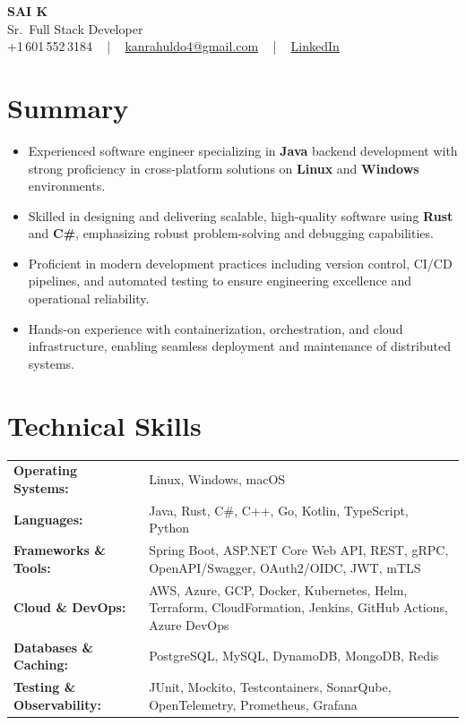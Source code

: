 \documentclass[letterpaper,11pt]{article}
\newcommand{\resumeItem}[1]{
  \item\footnotesize{
    {#1 \vspace{-2pt}}
  }
}
\newcommand{\resumeItemListStart}{\begin{itemize}[leftmargin=*]}
\newcommand{\resumeItemListEnd}{\end{itemize}\vspace{-5pt}}
\begin{document}
\begin{center}
    {\fontsize{14pt}{12pt}\selectfont \textbf{\MakeUppercase{Sai K}}}\\ \vspace{2pt}
    \fontsize{10pt}{12pt}\selectfont Sr.\ Full Stack Developer\\ \vspace{2pt}
    \fontsize{10pt}{12pt}\selectfont +1\,601\,552\,3184 ~ | ~
    \href{mailto:kanrahuldo4@gmail.com}{kanrahuldo4@gmail.com} ~ | ~
    \href{https://www.linkedin.com/in/srrrk/}{\color{blue}\underline{LinkedIn}}
    \vspace{-10pt}
\end{center}

\section{Summary}
\fontsize{9pt}{10pt}\selectfont
\resumeItemListStart
  \resumeItem{Experienced software engineer specializing in \textbf{Java} backend development with strong proficiency in cross-platform solutions on \textbf{Linux} and \textbf{Windows} environments.}
  \resumeItem{Skilled in designing and delivering scalable, high-quality software using \textbf{Rust} and \textbf{C\#}, emphasizing robust problem-solving and debugging capabilities.}
  \resumeItem{Proficient in modern development practices including version control, CI/CD pipelines, and automated testing to ensure engineering excellence and operational reliability.}
  \resumeItem{Hands-on experience with containerization, orchestration, and cloud infrastructure, enabling seamless deployment and maintenance of distributed systems.}
\resumeItemListEnd
\vspace{-6pt}

\section{Technical Skills}
\vspace{-14pt}
\begin{table}[h]
\fontsize{9pt}{10pt}\selectfont
\begin{tabular}{p{0.3\linewidth} p{0.7\linewidth}}
\textbf{Operating Systems:} & Linux, Windows, macOS \\
\textbf{Languages:} & Java, Rust, C\#, C++, Go, Kotlin, TypeScript, Python \\
\textbf{Frameworks \& Tools:} & Spring Boot, ASP.NET Core Web API, REST, gRPC, OpenAPI/Swagger, OAuth2/OIDC, JWT, mTLS \\
\textbf{Cloud \& DevOps:} & AWS, Azure, GCP, Docker, Kubernetes, Helm, Terraform, CloudFormation, Jenkins, GitHub Actions, Azure DevOps \\
\textbf{Databases \& Caching:} & PostgreSQL, MySQL, DynamoDB, MongoDB, Redis \\
\textbf{Testing \& Observability:} & JUnit, Mockito, Testcontainers, SonarQube, OpenTelemetry, Prometheus, Grafana \\
\end{tabular}
\end{table}
\vspace{-15pt}
\end{document}

